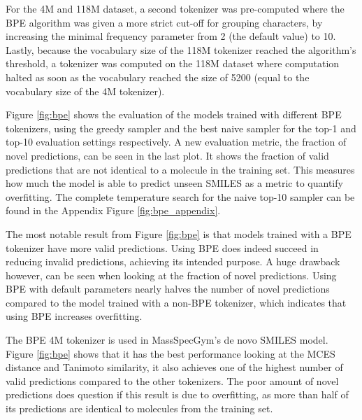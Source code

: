 For the 4M and 118M dataset, a second tokenizer was pre-computed where the \ac{BPE} algorithm was given a more strict cut-off for grouping characters, by increasing the minimal frequency parameter from 2 (the default value) to 10.
Lastly, because the vocabulary size of the 118M tokenizer reached the algorithm's threshold, a tokenizer was computed on the 118M dataset where computation halted as soon as the vocabulary reached the size of 5200 (equal to the vocabulary size of the 4M tokenizer). 

Figure \ref{fig:bpe} shows the evaluation of the models trained with different \ac{BPE} tokenizers, using the greedy sampler and the best naive sampler for the top-1 and top-10 evaluation settings respectively.
A new evaluation metric, the fraction of novel predictions, can be seen in the last plot.
It shows the fraction of valid predictions that are not identical to a molecule in the training set.
This measures how much the model is able to predict unseen SMILES as a metric to quantify overfitting.
The complete temperature search for the naive top-10 sampler can be found in the Appendix Figure \ref{fig:bpe_appendix}.

The most notable result from Figure \ref{fig:bpe} is that models trained with a \ac{BPE} tokenizer have more valid predictions.
Using \ac{BPE} does indeed succeed in reducing invalid predictions, achieving its intended purpose.
A huge drawback however, can be seen when looking at the fraction of novel predictions.
Using \ac{BPE} with default parameters nearly halves the number of novel predictions compared to the model trained with a non-BPE tokenizer, which indicates that using \ac{BPE} increases overfitting.

The \ac{BPE} 4M tokenizer is used in MassSpecGym's de novo SMILES model.
Figure \ref{fig:bpe} shows that it has the best performance looking at the MCES distance and Tanimoto similarity, it also achieves one of the highest number of valid predictions compared to the other tokenizers.
The poor amount of novel predictions does question if this result is due to overfitting, as more than half of its predictions are identical to molecules from the training set.

